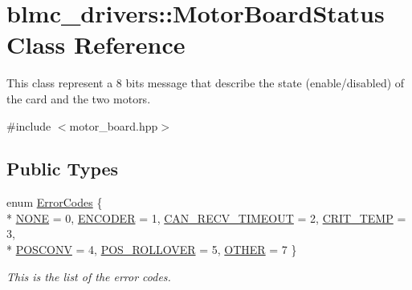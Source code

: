 \hypertarget{classblmc__drivers_1_1MotorBoardStatus}{}\section{blmc\+\_\+drivers\+:\+:Motor\+Board\+Status Class Reference}
\label{classblmc__drivers_1_1MotorBoardStatus}


This class represent a 8 bits message that describe the state (enable/disabled) of the card and the two motors.  




{\ttfamily \#include $<$motor\+\_\+board.\+hpp$>$}

\subsection*{Public Types}
\begin{DoxyCompactItemize}
\item 
enum \hyperlink{classblmc__drivers_1_1MotorBoardStatus_a9fd931e24550f5e5877d7a6cf499f6cf}{Error\+Codes} \{ \\*
\hyperlink{classblmc__drivers_1_1MotorBoardStatus_a9fd931e24550f5e5877d7a6cf499f6cfa99d623b3894cfb91a0626b56d0583f84}{N\+O\+NE} = 0, 
\hyperlink{classblmc__drivers_1_1MotorBoardStatus_a9fd931e24550f5e5877d7a6cf499f6cfab3a0b4c22659f24593503e41fce561d0}{E\+N\+C\+O\+D\+ER} = 1, 
\hyperlink{classblmc__drivers_1_1MotorBoardStatus_a9fd931e24550f5e5877d7a6cf499f6cfa25dd0ce676d69449a6fe0a02fa6e6a5d}{C\+A\+N\+\_\+\+R\+E\+C\+V\+\_\+\+T\+I\+M\+E\+O\+UT} = 2, 
\hyperlink{classblmc__drivers_1_1MotorBoardStatus_a9fd931e24550f5e5877d7a6cf499f6cfa43b0778d39a1aa2c193e2b511f2fe511}{C\+R\+I\+T\+\_\+\+T\+E\+MP} = 3, 
\\*
\hyperlink{classblmc__drivers_1_1MotorBoardStatus_a9fd931e24550f5e5877d7a6cf499f6cfa3134cc4a15dfbbeccd1305ad7f0e56cf}{P\+O\+S\+C\+O\+NV} = 4, 
\hyperlink{classblmc__drivers_1_1MotorBoardStatus_a9fd931e24550f5e5877d7a6cf499f6cfa87717db1d2ce92549a0bd95890c45f63}{P\+O\+S\+\_\+\+R\+O\+L\+L\+O\+V\+ER} = 5, 
\hyperlink{classblmc__drivers_1_1MotorBoardStatus_a9fd931e24550f5e5877d7a6cf499f6cfa2b6b3fa06a4bf24105805b604aff7280}{O\+T\+H\+ER} = 7
 \}\begin{DoxyCompactList}\small\item\em This is the list of the error codes. \end{DoxyCompactList}
\end{DoxyCompactItemize}
